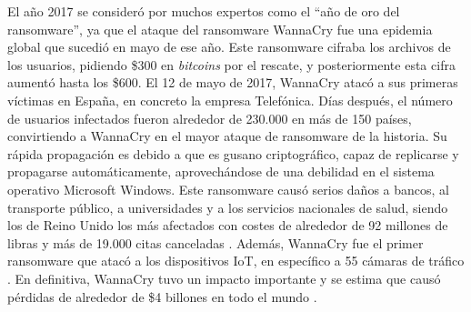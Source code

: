 

El año 2017 se consideró por muchos expertos como el ``año de oro del ransomware'', ya que el ataque del ransomware WannaCry fue una epidemia global que sucedió en mayo de ese año. Este ransomware cifraba los archivos de los usuarios, pidiendo \$300 en \textit{bitcoins} por el rescate, y posteriormente esta cifra aumentó hasta los \$600. El 12 de mayo de 2017, WannaCry atacó a sus primeras víctimas en España, en concreto la empresa Telefónica. Días después, el número de usuarios infectados fueron alrededor de 230.000 en más de 150 países, convirtiendo a WannaCry en el mayor ataque de ransomware de la historia. 
Su rápida propagación es debido a que es gusano criptográfico, capaz de replicarse y propagarse automáticamente, aprovechándose de una debilidad en el sistema operativo Microsoft Windows. %
Este ransomware causó serios daños a bancos, al transporte público, a universidades y a los servicios nacionales de salud, siendo los de Reino Unido los más afectados con costes de alrededor de 92 millones de libras y más de 19.000 citas canceladas \cite{62}.
Además, WannaCry fue el primer ransomware que atacó a los dispositivos \gls{IoT}, en específico a 55 cámaras de tráfico \cite{65}. En definitiva, WannaCry tuvo un impacto importante y se estima que causó pérdidas de alrededor de \$4 billones en todo el mundo \cite{61}.

